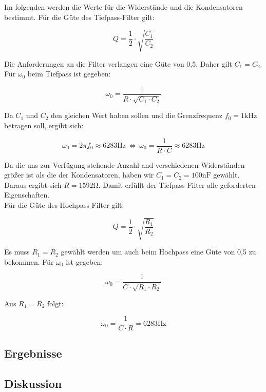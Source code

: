 Im folgenden werden die Werte für die Widerstände und die Kondensatoren bestimmt.
Für die Güte des Tiefpass-Filter gilt:

$$ Q = \frac{1}{2}\cdot\sqrt{\frac{C_{1}}{C_{2}}} $$

Die Anforderungen an die Filter verlangen eine Güte von 0,5. Daher gilt $C_{1}=C_{2}$.\\
Für $\omega_{0}$ beim Tiefpass ist gegeben:

$$\omega_{0}=\frac{1}{R\cdot\sqrt{C_{1} \cdot C_{2}}}$$

Da $C_{1}$ und $C_{2}$ den gleichen Wert haben sollen und die Grenzfrequenz $f_{0}=1\si{\kilo\hertz}$ betragen soll, ergibt sich:

$$\omega_{0}=2\pi f_{0} \approx 6283\si{\hertz} \, \Leftrightarrow \,\omega_{0}=\frac{1}{R\cdot C}\approx 6283\si{\hertz} $$

Da die uns zur Verfügung stehende Anzahl and verschiedenen Widerständen größer ist als die der Kondensatoren, haben wir $C_{1}=C_{2}=100\si{\nano\farad}$ gewählt.
Daraus ergibt sich $R=1592\si{\ohm}$. Damit erfüllt der Tiefpass-Filter alle geforderten Eigenschaften. \\
Für die Güte des Hochpass-Filter gilt:

$$Q=\frac{1}{2}\cdot\sqrt{\frac{R_{1}}{R_{2}}}$$

Es muss $R_{1}=R_{2}$ gewählt werden um auch beim Hochpass eine Güte von 0,5 zu bekommen.
Für $\omega_{0}$ ist gegeben:

$$\omega_{0} = \frac{1}{C\cdot\sqrt{R_{1}\cdot R_{2}}}$$

Aus $R_{1}=R_{2}$ folgt:

$$\omega_{0} = \frac{1}{C\cdot R}=6283\si{\hertz}$$





\subsection{Ergebnisse}

\subsection{Diskussion}


